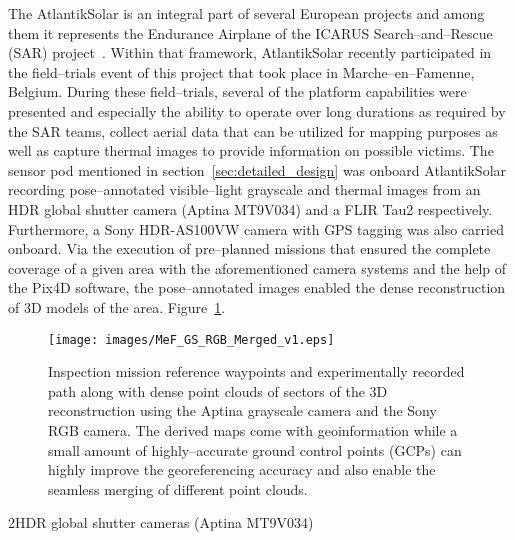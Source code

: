 
The AtlantikSolar is an integral part of several European projects and among them it represents the Endurance Airplane of the ICARUS Search--and--Rescue (SAR) project~\cite{ICARUSwebsite}. Within that framework, AtlantikSolar recently participated in the field--trials event of this project that took place in Marche--en--Famenne, Belgium. During these field--trials, several of the platform capabilities were presented and especially the ability to operate over long durations as required by the SAR teams, collect aerial data that can be utilized for mapping purposes as well as capture thermal images to provide information on possible victims. The sensor pod mentioned in section~\ref{sec:detailed_design} was onboard AtlantikSolar recording pose--annotated visible--light grayscale and thermal images from an HDR global shutter camera (Aptina MT9V034) and a FLIR Tau2 respectively. Furthermore, a Sony HDR-AS100VW camera with GPS tagging was also carried onboard. Via the execution of pre--planned missions that ensured the complete coverage of a given area with the aforementioned camera systems and the help of the Pix4D software, the pose--annotated images enabled the dense reconstruction of $3\textrm{D}$ models of the area. Figure~\ref{fig:mef_icarus_reconstruction}. 

%
\begin{figure}[htbp]
\begin{center}
  \texttt{[image: images/MeF\_GS\_RGB\_Merged\_v1.eps]} %
\end{center}
\caption{Inspection mission reference waypoints and experimentally recorded path along with dense point clouds of sectors of the $3\textrm{D}$ reconstruction using the Aptina grayscale camera and the Sony RGB camera. The derived maps come with geoinformation while a small amount of highly--accurate ground control points (GCPs) can highly improve the georeferencing accuracy and also enable the seamless merging of different point clouds.  }
\label{fig:mef_icarus_reconstruction}
\end{figure}
%

2HDR global shutter cameras (Aptina MT9V034)